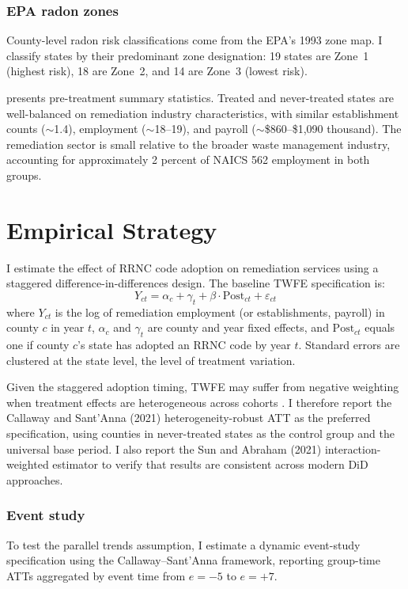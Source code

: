 \documentclass[12pt]{article}
\begin{document}
\subsubsection*{EPA radon zones} County-level radon risk classifications come from the EPA's 1993 zone map. I classify states by their predominant zone designation: 19 states are Zone~1 (highest risk), 18 are Zone~2, and 14 are Zone~3 (lowest risk).



 presents pre-treatment summary statistics. Treated and never-treated states are well-balanced on remediation industry characteristics, with similar establishment counts ($\sim$1.4), employment ($\sim$18--19), and payroll ($\sim$\$860--\$1,090 thousand). The remediation sector is small relative to the broader waste management industry, accounting for approximately 2 percent of NAICS 562 employment in both groups.

\section{Empirical Strategy}

I estimate the effect of RRNC code adoption on remediation services using a staggered difference-in-differences design. The baseline TWFE specification is:
\begin{equation}
Y_{ct} = \alpha_c + \gamma_t + \beta \cdot \text{Post}_{ct} + \varepsilon_{ct}
\end{equation}
where $Y_{ct}$ is the log of remediation employment (or establishments, payroll) in county $c$ in year $t$, $\alpha_c$ and $\gamma_t$ are county and year fixed effects, and $\text{Post}_{ct}$ equals one if county $c$'s state has adopted an RRNC code by year $t$. Standard errors are clustered at the state level, the level of treatment variation.

Given the staggered adoption timing, TWFE may suffer from negative weighting when treatment effects are heterogeneous across cohorts \citep{goodman2021difference, dechaisemartin2020two}. I therefore report the Callaway and Sant'Anna (2021) heterogeneity-robust ATT as the preferred specification, using counties in never-treated states as the control group and the universal base period. I also report the Sun and Abraham (2021) interaction-weighted estimator to verify that results are consistent across modern DiD approaches.

\subsubsection*{Event study} To test the parallel trends assumption, I estimate a dynamic event-study specification using the Callaway--Sant'Anna framework, reporting group-time ATTs aggregated by event time from $e = -5$ to $e = +7$.
\end{document}

